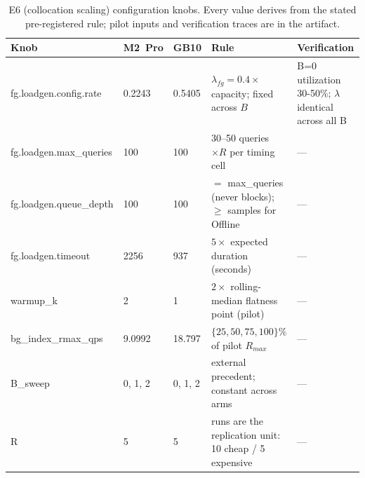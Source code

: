 \begin{table}[t]\centering\small
\caption{E6 (collocation scaling) configuration knobs. Every value derives from the stated pre-registered rule; pilot inputs and verification traces are in the artifact.}
\label{tab:knobs-e6}
\begin{tabular}{lllll}
\toprule
Knob & M2~Pro & GB10 & Rule & Verification \\
\midrule
fg.loadgen.config.rate & 0.2243 & 0.5405 & $\lambda_{fg} = 0.4\times$ capacity; fixed across $B$ & B=0 utilization 30-50\%; $\lambda$ identical across all B \\
fg.loadgen.max\_queries & 100 & 100 & 30--50 queries $\times R$ per timing cell & --- \\
fg.loadgen.queue\_depth & 100 & 100 & $=$ max\_queries (never blocks); $\geq$ samples for Offline & --- \\
fg.loadgen.timeout & 2256 & 937 & $5\times$ expected duration (seconds) & --- \\
warmup\_k & 2 & 1 & $2\times$ rolling-median flatness point (pilot) & --- \\
bg\_index\_rmax\_qps & 9.0992 & 18.797 & $\{25,50,75,100\}\%$ of pilot $R_{max}$ & --- \\
B\_sweep & 0, 1, 2 & 0, 1, 2 & external precedent; constant across arms & --- \\
R & 5 & 5 & runs are the replication unit: 10 cheap / 5 expensive & --- \\
\bottomrule
\end{tabular}
\end{table}


